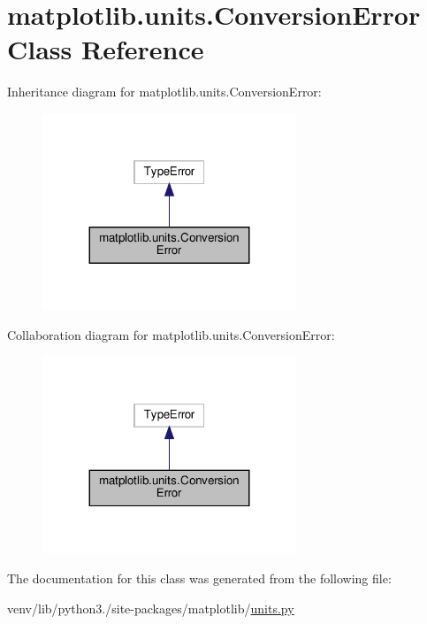 \hypertarget{classmatplotlib_1_1units_1_1ConversionError}{}\section{matplotlib.\+units.\+Conversion\+Error Class Reference}
\label{classmatplotlib_1_1units_1_1ConversionError}


Inheritance diagram for matplotlib.\+units.\+Conversion\+Error\+:
\nopagebreak
\begin{figure}[H]
\begin{center}
\leavevmode
\includegraphics[width=215pt]{classmatplotlib_1_1units_1_1ConversionError__inherit__graph}
\end{center}
\end{figure}


Collaboration diagram for matplotlib.\+units.\+Conversion\+Error\+:
\nopagebreak
\begin{figure}[H]
\begin{center}
\leavevmode
\includegraphics[width=215pt]{classmatplotlib_1_1units_1_1ConversionError__coll__graph}
\end{center}
\end{figure}


The documentation for this class was generated from the following file\+:\begin{DoxyCompactItemize}
\item 
venv/lib/python3./site-\/packages/matplotlib/\hyperlink{units_8py}{units.\+py}\end{DoxyCompactItemize}
